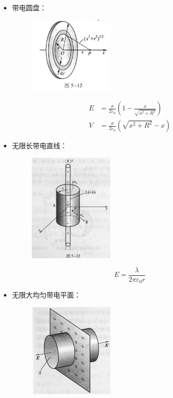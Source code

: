 \documentclass{ctexart}
\begin{document}
\begin{itemize}
    \item 带电圆盘：
    \begin{figure}[H]
        \centering
        \includegraphics[width=0.4\textwidth]{img/5-12.jpg}
    \end{figure}
    \begin{align*}
        E &= \frac{\sigma }{2 \varepsilon_0} \left(1-\frac{x}{\sqrt{x^2 + R^2}}\right) \\
        V &= \frac{\sigma}{2\varepsilon_0} (\sqrt{x^2+R^2} - x)
    \end{align*}
    \item 无限长带电直线：
    \begin{figure}[H]
        \centering
        \includegraphics[width=0.4\textwidth]{img/5-22.jpg}
    \end{figure}
    $$
        E = \frac{\lambda}{2\pi \varepsilon_0 r}
    $$
    \item 无限大均匀带电平面：
    \begin{figure}[H]
        \centering
        \includegraphics[width=0.4\textwidth]{img/5-23.jpg}

\end{figure}
\end{itemize}
\end{document}
